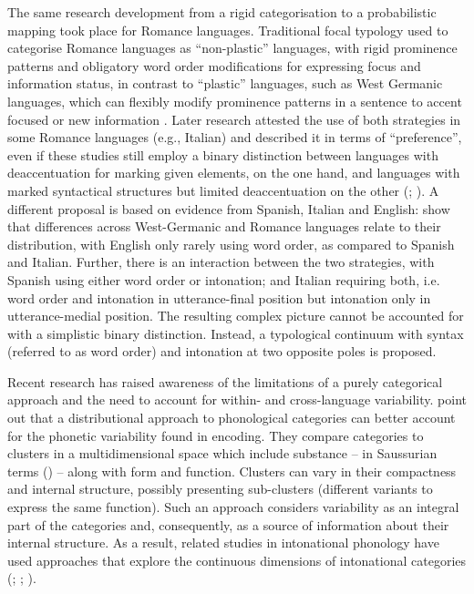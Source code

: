 The same research development from a rigid categorisation to a probabilistic mapping took place for Romance languages. Traditional focal typology used to categorise Romance languages as “non-plastic” languages, with rigid prominence patterns and obligatory word order modifications for expressing focus and information status, in contrast to “plastic” languages, such as West Germanic languages, which can flexibly modify prominence patterns in a sentence to accent focused or new information \citep{Vallduví1991}. Later research attested the use of both strategies in some Romance languages (e.g., Italian) and described it in terms of “preference”, even if these studies still employ a binary distinction between languages with deaccentuation for marking given elements, on the one hand, and languages with marked syntactical structures but limited deaccentuation on the other (\citealt{Cruttenden1993}; \citealt{Ladd1996,Ladd2008}). A different proposal is based on evidence from Spanish, Italian and English: \citet{FaceDImperio2005} show that differences across West-Germanic and Romance languages relate to their distribution, with English only rarely using word order, as compared to Spanish and Italian. Further, there is an interaction between the two strategies, with Spanish using either word order or intonation; and Italian requiring both, i.e. word order and intonation in utterance-final position but intonation only in utterance-medial position. The resulting complex picture cannot be accounted for with a simplistic binary distinction. Instead, a typological continuum with syntax (referred to as word order) and intonation at two opposite poles is proposed.

Recent research has raised awareness of the limitations of a purely categorical approach and the need to account for within- and cross-language variability. \citet{CangemiGrice2016} point out that a distributional approach to phonological categories can better account for the phonetic variability found in encoding. They compare categories to clusters in a multidimensional space which include substance – in Saussurian terms (\citealt{DeSaussure1916}) – along with form and function. Clusters can vary in their compactness and internal structure, possibly presenting sub-clusters (different variants to express the same function). Such an approach considers variability as an integral part of the categories and, consequently, as a source of information about their internal structure. As a result, related studies in intonational phonology have used approaches that explore the continuous dimensions of intonational categories (\citealt{CangemiGrice2016}; \citealt{GriceEtAl2017}; \citealt{RoessigEtAl2019}).

